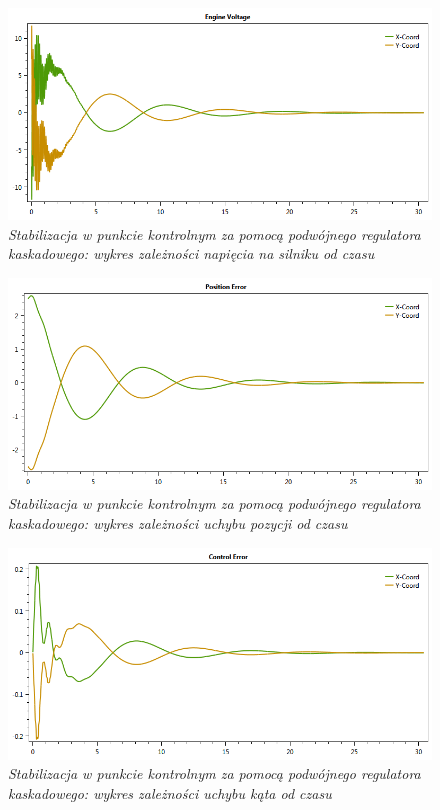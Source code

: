 \documentclass[12pt, twoside, openany]{report}
\theoremstyle{definition}
\begin{document}
\begin{figure}[H]
	\centering
		\includegraphics[width = 350pt]{LineCasPIDEV} 
		\caption{\textit{Stabilizacja w punkcie kontrolnym za pomocą podwójnego regulatora kaskadowego: wykres zależności napięcia na silniku od czasu}}
		\label{plot:LineCasPIDEV}
\end{figure}

\begin{figure}[H]
	\centering
		\includegraphics[width = 350pt]{LineCasPIDCEP} 
		\caption{\textit{Stabilizacja w punkcie kontrolnym za pomocą podwójnego regulatora kaskadowego: wykres zależności uchybu pozycji od czasu}}
		\label{plot:LineCasPIDCEP}
\end{figure}

\begin{figure}[H]
	\centering
		\includegraphics[width = 350pt]{LineCasPIDCEA} 
		\caption{\textit{Stabilizacja w punkcie kontrolnym za pomocą podwójnego regulatora kaskadowego: wykres zależności uchybu kąta od czasu}}
		\label{plot:LineCasPIDCEA}
\end{figure}
\end{document}
